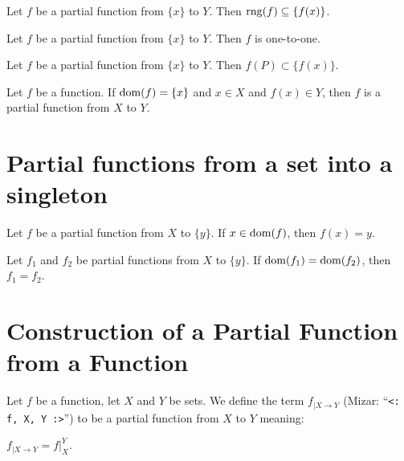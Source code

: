 \documentclass{article}
\begin{document}
\begin{thm}
\item\label{partfun1:16} Let $f$ be a partial function from $\{x\}$ to $Y$.
  Then $\operatorname{rng}(f)\subseteq\{f(x)\}$.
\item\label{partfun1:17} Let $f$ be a partial function from $\{x\}$ to $Y$.
  Then $f$ is one-to-one.
\item\label{partfun1:18} Let $f$ be a partial function from $\{x\}$ to $Y$.
  Then $f(P)\subset\{f(x)\}$.
\item\label{partfun1:19} Let $f$ be a function.
  If $\operatorname{dom}(f)=\{x\}$ and $x\in X$ and $f(x)\in Y$,
  then $f$ is a partial function from $X$ to $Y$.
\end{thm}

\section{Partial functions from a set into a singleton}

\begin{thm}
\item\label{partfun1:20} Let $f$ be a partial function from $X$ to $\{y\}$.
  If $x\in\operatorname{dom}(f)$, then $f(x)=y$.
\item\label{partfun1:21} Let $f_{1}$ and $f_{2}$ be partial functions from $X$ to $\{y\}$.
  If $\operatorname{dom}(f_{1})=\operatorname{dom}(f_{2})$, then $f_{1}=f_{2}$.
\end{thm}

\section{Construction of a Partial Function from a Function}

\begin{definition}
Let $f$ be a function, let $X$ and $Y$ be sets.
We define the term $f_{|X\to Y}$ (Mizar: ``\verb#<: f, X, Y :>#'')
to be a partial function from $X$ to $Y$ meaning:
\begin{defn}
\item $f_{|X\to Y} = f|^{Y}_{X}$.
\end{defn}
\end{definition}
\end{document}
